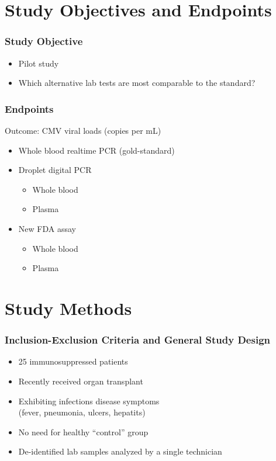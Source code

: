 \documentclass[xcolor=dvipsnames]{beamer}
\begin{document}

\section{Study Objectives and Endpoints}

\begin{frame}
\frametitle{Study Objective}
\begin{itemize}
\item Pilot study
\item Which alternative lab tests are most comparable to the standard?
\end{itemize}
\end{frame}




\begin{frame}
\frametitle{Endpoints}
Outcome: CMV viral loads (copies per mL)
\begin{itemize}
\item Whole blood realtime PCR (gold-standard)
\item Droplet digital PCR
	\begin{itemize}
	\item Whole blood
	\item Plasma
	\end{itemize}
\item New FDA assay
	\begin{itemize}
	\item Whole blood
	\item Plasma
	\end{itemize}
\end{itemize}
\end{frame}




\section{Study Methods}


\begin{frame}
\frametitle{Inclusion-Exclusion Criteria and General Study Design}
\begin{itemize}
\item 25 immunosuppressed patients
\item Recently received organ transplant
\item Exhibiting infections disease symptoms \\ (fever, pneumonia, ulcers, hepatits)
\item No need for healthy ``control'' group
\item De-identified lab samples analyzed by a single technician
\end{itemize}
\end{frame}
\end{document}
